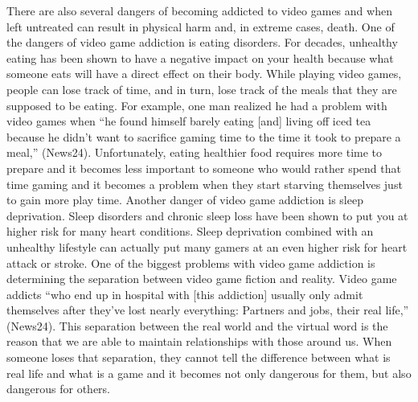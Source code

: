 \documentclass[a4paper,man,natbib]{apa6}
\renewcommand{\paragraph}{}
\begin{document}
\paragraph{}There are also several dangers of becoming addicted to video games and when left untreated can result in physical harm and, in extreme cases, death. One of the dangers of video game addiction is eating disorders. For decades, unhealthy eating has been shown to have a negative impact on your health because what someone eats will have a direct effect on their body. While playing video games, people can lose track of time, and in turn, lose track of the meals that they are supposed to be eating. For example, one man realized he had a problem with video games when “he found himself barely eating [and] living off iced tea because he didn't want to sacrifice gaming time to the time it took to prepare a meal,” (News24). Unfortunately, eating healthier food requires more time to prepare and it becomes less important to someone who would rather spend that time gaming and it becomes a problem when they start starving themselves just to gain more play time. Another danger of video game addiction is sleep deprivation. Sleep disorders and chronic sleep loss have been shown to put you at higher risk for many heart conditions. Sleep deprivation combined with an unhealthy lifestyle can actually put many gamers at an even higher risk for heart attack or stroke. One of the biggest problems with video game addiction is determining the separation between video game fiction and reality. Video game addicts “who end up in hospital with [this addiction] usually only admit themselves after they've lost nearly everything: Partners and jobs, their real life,” (News24). This separation between the real world and the virtual word is the reason that we are able to maintain relationships with those around us. When someone loses that separation, they cannot tell the difference between what is real life and what is a game and it becomes not only dangerous for them, but also dangerous for others.
\end{document}
